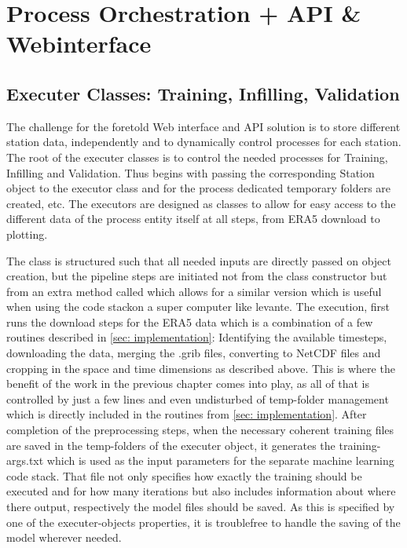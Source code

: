 
\section{Process Orchestration + API \& Webinterface}
\label{sec: process_orchestration}

\subsection{Executer Classes: Training, Infilling, Validation}

The challenge for the foretold Web interface and API solution is to store different station data, independently and to dynamically control processes for each station. The root of the executer classes is to control the needed processes for Training, Infilling and Validation. Thus begins with passing the corresponding Station object to the executor class and for the process dedicated temporary folders are created, etc. The executors are designed as classes to allow for easy access to the different data of the process entity itself at all steps, from ERA5 download to plotting.

The  class is structured such that all needed inputs are directly passed on object creation, but the pipeline steps are initiated not from the class constructor but from an extra method called  which allows for a similar  version which is useful when using the code stackon a super computer like levante.
The execution, first runs the download steps for the ERA5 data which is a combination of a few routines described in \autoref{sec: implementation}: Identifying the available timesteps, downloading the data, merging the .grib files, converting to NetCDF files and cropping in the space and time dimensions as described above. This is where the benefit of the work in the previous chapter comes into play, as all of that is controlled by just a few lines and even undisturbed of temp-folder management which is directly included in the routines from \autoref{sec: implementation}.
After completion of the preprocessing steps, when the necessary coherent training files are saved in the temp-folders of the executer object, it generates the training-args.txt which is used as the input parameters for the separate machine learning code stack. That file not only specifies how exactly the training should be executed and for how many iterations but also includes information about where there output, respectively the model files should be saved. As this is specified by one of the executer-objects properties, it is troublefree to handle the saving of the model wherever needed.

